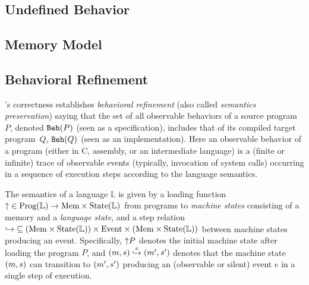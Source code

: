 


\section{\cc{}}

\subsection{Undefined Behavior}
\lipsum[1-3]

\subsection{Memory Model}
\lipsum[1-3]

\subsection{Behavioral Refinement}
\cc{}'s correctness establishes \emph{behavioral refinement}
(also called \emph{semantics preservation}) saying that
the set of all observable behaviors of a source program~$P$, denoted $\mathtt{Beh}({P})$ (seen as a specification),
includes that of its compiled target program~$Q$, \ie $\mathtt{Beh}({Q})$ (seen as an implementation).
Here an observable behavior of a program (either in C, assembly, or an
intermediate language) is a (finite or infinite) trace of observable events
(typically, invocation of system calls) occurring in a sequence of execution steps according to the language semantics.

The semantics of a language $\mathbb{L}$ is given by a loading
function ${{\uparrow}} \in \textrm{Prog}(\mathbb{L}) \to \textrm{Mem}\times\textrm{State}(\mathbb{L})$
from programs to \emph{machine states} consisting of a memory and a \emph{language state},
and a step relation
${\hookrightarrow} \subseteq { (\textrm{Mem}\times\textrm{State}(\mathbb{L})) \times \textrm{Event}\times (\textrm{Mem}\times\textrm{State}(\mathbb{L}))}$
between machine states producing an event.
Specifically, ${\uparrow}{P}$ denotes the initial machine state after loading the program $P$, and
$(m,s) \stackrel{e}{\hookrightarrow} (m',s')$ denotes that the machine state $(m,s)$ can transition to
$(m',s')$ producing an (observable or silent) event $e$ in a single step of
execution.





